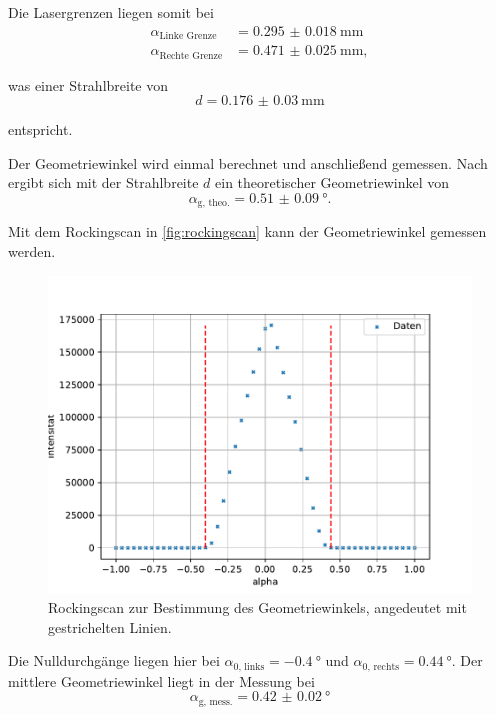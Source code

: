 Die Lasergrenzen liegen somit bei
\begin{align*}
    \alpha_\text{Linke Grenze} &= \qty{0.295(18)}{\milli\meter} \\
    \alpha_\text{Rechte Grenze} &= \qty{0.471(25)}{\milli\meter},
\end{align*}

was einer Strahlbreite von 
\begin{equation*}
    d = \qty{0.176(30)}{\milli\meter}
\end{equation*}

entspricht. 

Der Geometriewinkel wird einmal berechnet und anschließend gemessen. Nach %
ergibt sich mit der Strahlbreite $d$ ein theoretischer Geometriewinkel von
\begin{equation*}
    \alpha_\text{g, theo.} = \qty{0.51(9)}{\degree}.
\end{equation*}

Mit dem Rockingscan in \autoref{fig:rockingscan} kann der Geometriewinkel gemessen werden.

\begin{figure}[H]
    \centering
    \includegraphics[width=\textwidth]{plots/rockingscan.pdf}
    \caption{Rockingscan zur Bestimmung des Geometriewinkels, angedeutet mit gestrichelten Linien.}
    \label{fig:rockingscan}
\end{figure}

Die Nulldurchgänge liegen hier bei $\alpha_{0\text{, links}} = \qty{-0.4}{\degree}$ und $\alpha_{0\text{, rechts}} = \qty{0.44}{\degree}$.
Der mittlere Geometriewinkel liegt in der Messung bei 
\begin{equation*}
    \alpha_\text{g, mess.} = \qty{0.42(2)}{\degree}
\end{equation*}